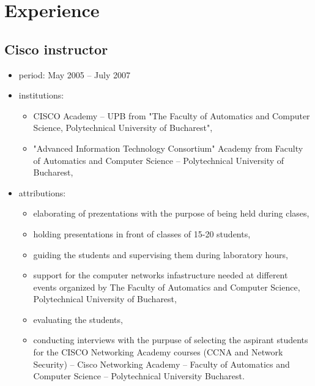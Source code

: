 \section{Experience}
	\subsection{Cisco instructor}
		\begin{itemize}
			\item period: May 2005 – July 2007 
			\item institutions: 
			\begin{itemize}
			 	\item CISCO Academy – UPB from "The Faculty of Automatics and Computer Science, Polytechnical University of Bucharest", 
				\item "Advanced Information Technology Consortium" Academy from Faculty of Automatics and Computer Science – Polytechnical University of Bucharest,
			\end{itemize}
			\item attributions:
			\begin{itemize}
			 	\item elaborating of prezentations with the purpose of being held during clases,
				\item holding presentations in front of classes of 15-20 students,
				\item guiding the students and supervising them during laboratory hours,
				\item support for the computer networks infastructure needed at different events organized by The Faculty of Automatics and Computer Science, Polytechnical University of Bucharest,
				\item evaluating the students,
				\item conducting interviews with the purpuse of selecting the aspirant students for the CISCO Networking Academy courses (CCNA and Network Security) – Cisco Networking Academy – Faculty of Automatics and Computer Science – Polytechnical University Bucharest. 
	
			\end{itemize}
		\end{itemize}
